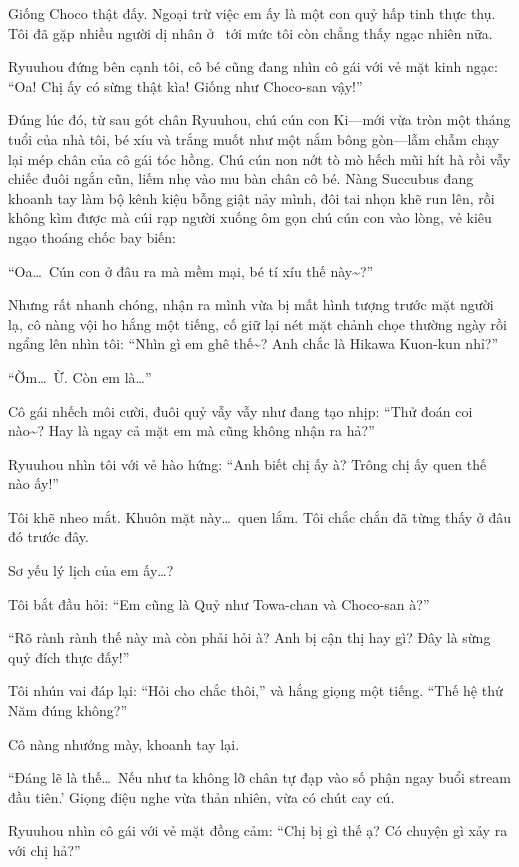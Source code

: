 \documentclass[../main.tex]{subfiles}
\begin{document}
Giống Choco thật đấy. Ngoại trừ việc em ấy là một con quỷ hấp tinh thực thụ. Tôi đã gặp nhiều người dị nhân ở \hll\ tới mức tôi còn chẳng thấy ngạc nhiên nữa.

Ryuuhou đứng bên cạnh tôi, cô bé cũng đang nhìn cô gái với vẻ mặt kinh ngạc: ``Oa! Chị ấy có sừng thật kìa! Giống như Choco-san vậy!''

Đúng lúc đó, từ sau gót chân Ryuuhou, chú cún con Ki—mới vừa tròn một tháng tuổi của nhà tôi, bé xíu và trắng muốt như một nắm bông gòn—lẫm chẫm chạy lại mép chân của cô gái tóc hồng. Chú cún non nớt tò mò hếch mũi hít hà rồi vẫy chiếc đuôi ngắn cũn, liếm nhẹ vào mu bàn chân cô bé. Nàng Succubus đang khoanh tay làm bộ kênh kiệu bỗng giật nảy mình, đôi tai nhọn khẽ run lên, rồi không kìm được mà cúi rạp người xuống ôm gọn chú cún con vào lòng, vẻ kiêu ngạo thoáng chốc bay biến:

``Oa\dots\ Cún con ở đâu ra mà mềm mại, bé tí xíu thế này\~{}?''

Nhưng rất nhanh chóng, nhận ra mình vừa bị mất hình tượng trước mặt người lạ, cô nàng vội ho hắng một tiếng, cố giữ lại nét mặt chảnh chọe thường ngày rồi ngẩng lên nhìn tôi: ``Nhìn gì em ghê thế\~{}? Anh chắc là Hikawa Kuon-kun nhỉ?''

``Ờm\dots\ Ừ. Còn em là\dots''

Cô gái nhếch môi cười, đuôi quỷ vẫy vẫy như đang tạo nhịp: ``Thử đoán coi nào\~{}? Hay là ngay cả mặt em mà cũng không nhận ra hả?''

Ryuuhou nhìn tôi với vẻ hào hứng: ``Anh biết chị ấy à? Trông chị ấy quen thế nào ấy!''

Tôi khẽ nheo mắt. Khuôn mặt này\dots\ quen lắm. Tôi chắc chắn đã từng thấy ở đâu đó trước đây.

Sơ yếu lý lịch của em ấy\dots?

Tôi bắt đầu hỏi: ``Em cũng là Quỷ như Towa-chan và Choco-san à?''

``Rõ rành rành thế này mà còn phải hỏi à? Anh bị cận thị hay gì? Đây là sừng quỷ đích thực đấy!''

Tôi nhún vai đáp lại: ``Hỏi cho chắc thôi,'' và hắng giọng một tiếng. ``Thế hệ thứ Năm đúng không?''

Cô nàng nhướng mày, khoanh tay lại.

``Đáng lẽ là thế\dots\ Nếu như ta không lỡ chân tự đạp vào số phận ngay buổi stream đầu tiên.' Giọng điệu nghe vừa thản nhiên, vừa có chút cay cú.

Ryuuhou nhìn cô gái với vẻ mặt đồng cảm: ``Chị bị gì thế ạ? Có chuyện gì xảy ra với chị hả?''
\end{document}
